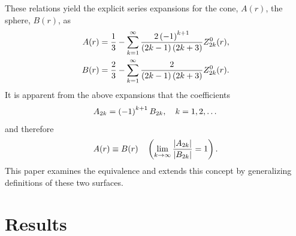 \documentclass[preprint,12pt]{elsarticle}
\begin{document}
These relations yield the explicit series expansions for the cone, $A(r)$, the sphere, $B(r)$, as
  \begin{equation}
    \begin{split}
      A(r) &= \frac{1}{3} - \sum_{k=1}^{\infty} \frac{2\left( -1 \right)^{k+1}}{\left( 2k-1 \right) \left( 2k+3 \right)} Z_{2k}^{0}(r),\\
      B(r) &= \frac{2}{3} - \sum_{k=1}^{\infty} \frac{2}{\left( 2k-1 \right) \left( 2k+3 \right)} Z_{2k}^{0}(r).
    \end{split}
  \end{equation}
It is apparent from the above expansions that the coefficients
\begin{equation}
  A_{2k} = \left( -1 \right)^{k+1}B_{2k}, \quad k=1,2,\dots
\end{equation}
and therefore
\begin{equation}
  A(r) \equiv B(r) \quad \left( \lim_{k\to\infty} \frac{\left|A_{2k}\right|} {\left|B_{2k}\right|} = 1 \right).
\end{equation}
This paper examines the equivalence and extends this concept by generalizing definitions of these two surfaces.

\section{Results}
\label{sec:results}
\end{document}
